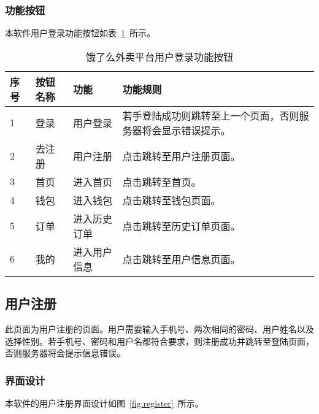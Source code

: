 \subsubsection{功能按钮}
本软件用户登录功能按钮如表~\ref{tab:table10}~所示。
\begin{table}[htbp]
    \caption{饿了么外卖平台用户登录功能按钮}\label{tab:table10}
    \vspace{0.5em}\wuhao
    \begin{tabularx}{\textwidth}{lllX}
    \toprule[1.5pt]
    序号 & 按钮名称 & 功能 & 功能规则 \\ 
    \midrule[1pt]
    1 & 登录 & 用户登录 & 若手登陆成功则跳转至上一个页面，否则服务器将会显示错误提示。 \\
    2 & 去注册 & 用户注册 & 点击跳转至用户注册页面。 \\
    3 & 首页 & 进入首页 & 点击跳转至首页。 \\
    4 & 钱包 & 进入钱包 & 点击跳转至钱包页面。 \\
    5 & 订单 & 进入历史订单 & 点击跳转至历史订单页面。 \\
    6 & 我的 & 进入用户信息 & 点击跳转至用户信息页面。 \\
\bottomrule[1.5pt]
\end{tabularx}
\vspace{\baselineskip}
\end{table}

\subsection{用户注册}
此页面为用户注册的页面。用户需要输入手机号、两次相同的密码、用户姓名以及选择性别。若手机号、密码和用户名都符合要求，则注册成功并跳转至登陆页面，否则服务器将会提示信息错误。
\subsubsection{界面设计}
本软件的用户注册界面设计如图~\ref{fig:register}~所示。
